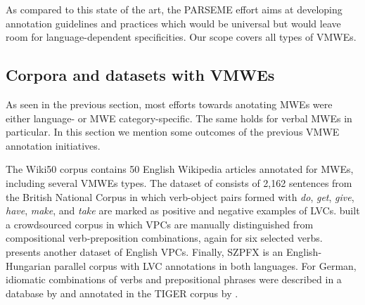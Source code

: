 \documentclass[output=paper,
modfonts,
]{langscibook}
\begin{document}
As compared to this state of the art, the PARSEME effort aims at developing annotation guidelines and practices which would be universal but would leave room for language-dependent specificities. Our scope covers all types of VMWEs.





\subsection{Corpora and datasets with VMWEs}
\label{sec:related-datasets}

As seen in the previous section, most efforts towards anotating MWEs were either language- or MWE category-specific. The same holds for verbal MWEs in particular. In this section we mention some outcomes of the previous VMWE annotation initiatives.


The Wiki50 \citep{wiki50} corpus contains 50 English Wi\-ki\-pe\-dia articles annotated for MWEs, including several VMWEs types.  The dataset of \citet{tu-roth:2011:MWE} consists of 2,162 sentences from the British National Corpus in which verb-object pairs formed with \textit{do}, \textit{get}, \textit{give}, \textit{have}, \textit{make}, and \textit{take} are marked as positive and negative examples of LVCs. \citet{Tu:2012} built a crowdsourced corpus in which VPCs are manually distinguished from compositional verb-preposition combinations, again for six selected verbs. \citet{baldwin08} presents another dataset of English VPCs. Finally, SZPFX \citep{paralellfx} is an English-Hungarian parallel corpus with LVC annotations in both languages. 
For German, idiomatic combinations of verbs and prepositional phrases were described in a database by \citet{krenn} and annotated in the TIGER corpus by \citet{Brants2005}.
\end{document}
